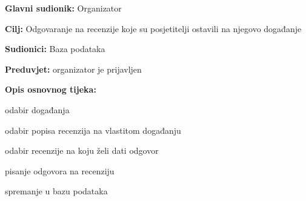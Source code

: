 					\noindent {}
					\begin{packed_item}
	
						\item \textbf{Glavni sudionik: }Organizator
						\item  \textbf{Cilj:} Odgovaranje na recenzije koje su posjetitelji ostavili na njegovo događanje
						\item  \textbf{Sudionici:} Baza podataka
						\item  \textbf{Preduvjet:} organizator je prijavljen
						\item  \textbf{Opis osnovnog tijeka:}
						
						\item[] \begin{packed_enum}

							\item odabir događanja							
							\item odabir popisa recenzija na vlastitom događanju 
							\item odabir recenzije na koju želi dati odgovor
							\item pisanje odgovora na recenziju 
							\item spremanje u bazu podataka
							
						\end{packed_enum}

					\end{packed_item}
					
